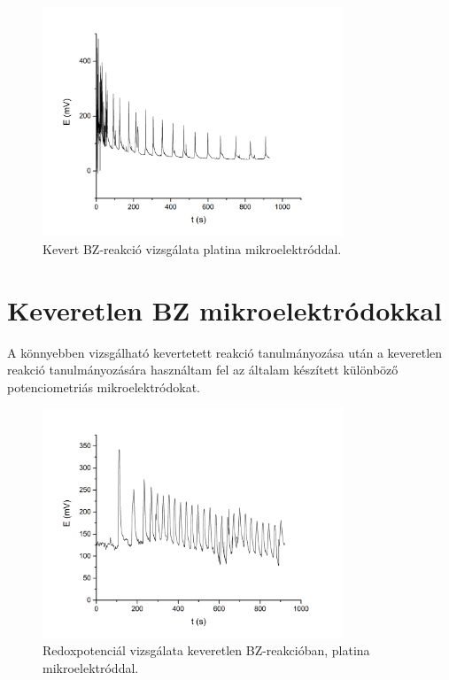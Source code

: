 \begin{figure}[h]
\centering
\includegraphics[width=0.8\textwidth]{img/platina_kevert.jpg}
\caption{Kevert BZ-reakció vizsgálata  platina mikroelektróddal.}
\label{fig:platina_kevert}
\end{figure}


\section{Keveretlen BZ mikroelektródokkal}
A könnyebben vizsgálható kevertetett reakció tanulmányozása után a keveretlen reakció tanulmányozására használtam fel az általam készített különböző potenciometriás mikroelektródokat.
\begin{figure}[h]
\centering
\includegraphics[width=0.8\textwidth]{img/platina_keveretlen.jpg}
\caption{Redoxpotenciál vizsgálata keveretlen BZ-reakcióban, platina mikroelektróddal.}
\label{fig:platina_keveretlen}
\end{figure}

